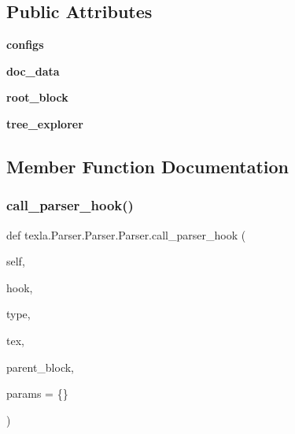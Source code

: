 \subsection*{Public Attributes}
\begin{DoxyCompactItemize}
\item 
\hypertarget{classtexla_1_1Parser_1_1Parser_1_1Parser_ae261ebc4805082d9e913ac94fddbbf2c}{}\label{classtexla_1_1Parser_1_1Parser_1_1Parser_ae261ebc4805082d9e913ac94fddbbf2c} 
{\bfseries configs}
\item 
\hypertarget{classtexla_1_1Parser_1_1Parser_1_1Parser_a7b3170987364bf71a42581ff7d768002}{}\label{classtexla_1_1Parser_1_1Parser_1_1Parser_a7b3170987364bf71a42581ff7d768002} 
{\bfseries doc\+\_\+data}
\item 
\hypertarget{classtexla_1_1Parser_1_1Parser_1_1Parser_a64d8a35b7496d8dfd1046cd74ea91500}{}\label{classtexla_1_1Parser_1_1Parser_1_1Parser_a64d8a35b7496d8dfd1046cd74ea91500} 
{\bfseries root\+\_\+block}
\item 
\hypertarget{classtexla_1_1Parser_1_1Parser_1_1Parser_aa71568a987d222cca941991fcb7d0f92}{}\label{classtexla_1_1Parser_1_1Parser_1_1Parser_aa71568a987d222cca941991fcb7d0f92} 
{\bfseries tree\+\_\+explorer}
\end{DoxyCompactItemize}


\subsection{Member Function Documentation}
\hypertarget{classtexla_1_1Parser_1_1Parser_1_1Parser_a7fa931c1a8b0b570977fb5c311ea9ec0}{}\label{classtexla_1_1Parser_1_1Parser_1_1Parser_a7fa931c1a8b0b570977fb5c311ea9ec0} 
\subsubsection{\texorpdfstring{call\+\_\+parser\+\_\+hook()}{call\_parser\_hook()}}
{\footnotesize\ttfamily def texla.\+Parser.\+Parser.\+Parser.\+call\+\_\+parser\+\_\+hook (\begin{DoxyParamCaption}\item[{}]{self,  }\item[{}]{hook,  }\item[{}]{type,  }\item[{}]{tex,  }\item[{}]{parent\+\_\+block,  }\item[{}]{params = {\ttfamily \{\}} }\end{DoxyParamCaption})}

